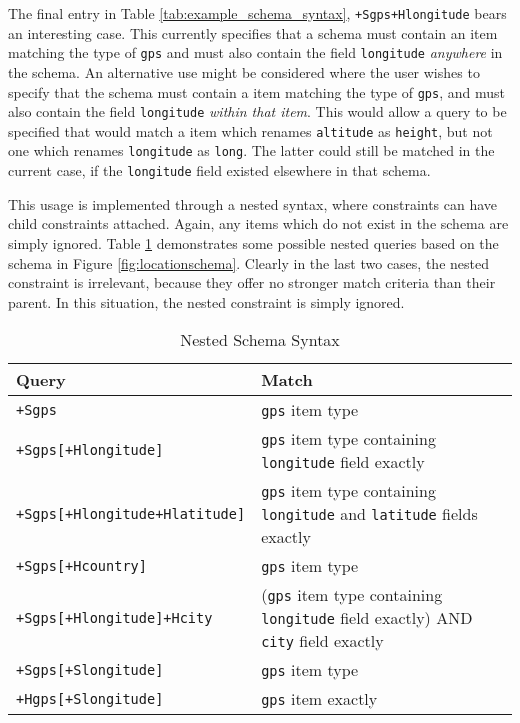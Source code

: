 \documentclass[12pt,twoside,notitlepage]{report}
\begin{document}
The final entry in Table \ref{tab:example_schema_syntax}, {\tt +Sgps+Hlongitude} bears an interesting case. 
This currently specifies that a schema must contain an item matching the type of {\tt gps} and must also contain the field {\tt longitude} {\sl anywhere} in the schema. 
An alternative use might be considered where the user wishes to specify that the schema must contain a item matching the type of {\tt gps}, and must also contain the field {\tt longitude} {\sl within that item}. 
This would allow a query to be specified that would match a item which renames {\tt altitude} as {\tt height}, but not one which renames {\tt longitude} as {\tt long}. 
The latter could still be matched in the current case, if the {\tt longitude} field existed elsewhere in that schema. 

This usage is implemented through a nested syntax, where constraints can have child constraints attached. 
Again, any items which do not exist in the schema are simply ignored. 
Table \ref{tab:nested_schema_syntax} demonstrates some possible nested queries based on the schema in Figure \ref{fig:locationschema}. 
Clearly in the last two cases, the nested constraint is irrelevant, because they offer no stronger match criteria than their parent. 
In this situation, the nested constraint is simply ignored.

\begin{table}
\centering

\begin{tabular}{l p{8cm}}
\hline\hline
Query & Match \\
\hline

{\tt +Sgps}							& {\tt gps} item type \\
{\tt +Sgps[+Hlongitude]}			& {\tt gps} item type containing {\tt longitude} field exactly \\
{\tt +Sgps[+Hlongitude+Hlatitude]}	& {\tt gps} item type containing {\tt longitude} and {\tt latitude} fields exactly \\

{\tt +Sgps[+Hcountry]}				& {\tt gps} item type \\

{\tt +Sgps[+Hlongitude]+Hcity}		& ({\tt gps} item type containing {\tt longitude} field exactly) AND {\tt city} field exactly \\

{\tt +Sgps[+Slongitude]}			& {\tt gps} item type \\
{\tt +Hgps[+Slongitude]}			& {\tt gps} item exactly \\

\hline
\end{tabular}

\caption{Nested Schema Syntax}
\label{tab:nested_schema_syntax}
\end{table}
\end{document}

